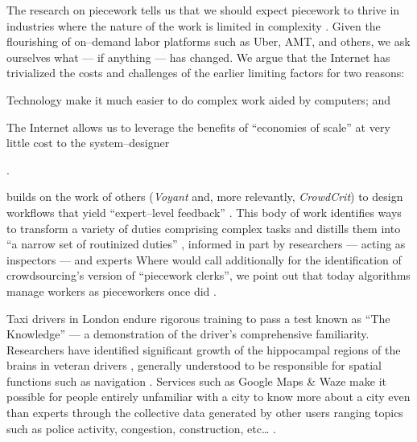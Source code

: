 \documentclass[trackingWork]{subfiles}
\begin{document}
\subsubsubsection{\whatchanged}
The research on piecework tells us that
we should expect piecework to thrive in industries where
the nature of the work is limited in complexity
\cite{Brown01041990}.
Given the flourishing of on--demand labor platforms such as
Uber, AMT, and others, we ask ourselves
what --- if anything --- has changed.
We argue that
the Internet has trivialized
the costs and challenges of the earlier limiting factors for two reasons:
\begin{inlinelist}
  \item Technology make it much easier to do complex work aided by computers; and %
  \item The Internet allows us to leverage the benefits of
        ``economies of scale'' at very little cost
        to the system--designer \cite{lessig2006code,miller2011understanding}
\end{inlinelist}.

\citeauthor{yuanAlmost} builds on the work of others
(\textit{Voyant} and, more relevantly, \textit{CrowdCrit})
to design workflows that yield ``expert--level feedback''
\cite{yuanAlmost,Xu:2014:VGS:2531602.2531604,Luther:2014:CCA:2556420.2556788}.
This body of work identifies ways to transform a variety of duties comprising complex tasks
and distills them into ``a narrow set of routinized duties''%
, informed in part by researchers --- acting as inspectors --- and experts
\cite[quotations from][]{10.2307/23702539}
Where \citeauthor{10.2307/23702539} would call additionally for the identification of
crowdsourcing's version of ``piecework clerks'', we point out that
today algorithms manage workers as pieceworkers once did
\cite{uberAlgorithm,10.2307/23702539}.

Taxi drivers in London endure rigorous training to pass a test known as ``The Knowledge''
--- a demonstration of the driver's comprehensive familiarity.
Researchers have identified significant growth of
the hippocampal regions of the brains in veteran drivers%
, generally understood to be responsible for spatial functions such as navigation
\cite{Maguire11042000,Maguire2894,Skok:1999:KML:299513.299625%
,       skok2000managing,Woollett1407,woollett2011acquiring}.
Services such as Google Maps \& Waze make it possible for
people entirely unfamiliar with a city
to know more about a city even than experts through
the collective data generated by other users
ranging topics such as police activity, congestion, construction, etc\dots
\cite{silva2013traffic,hind2014outsmarting}.
\end{document}
